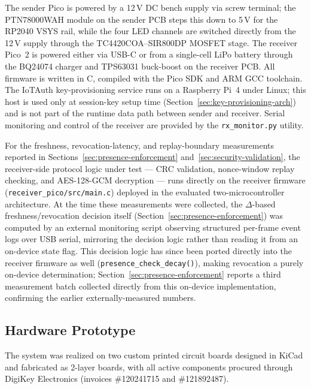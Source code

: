 \documentclass[conference]{IEEEtran}
\begin{document}
The sender Pico is powered by a 12\,V DC bench supply via screw terminal; the PTN78000WAH module on the sender PCB steps this down to 5\,V for the RP2040 VSYS rail, while the four LED channels are switched directly from the 12\,V supply through the TC4420COA--SIR800DP MOSFET stage. The receiver Pico~2 is powered either via USB-C or from a single-cell LiPo battery through the BQ24074 charger and TPS63031 buck-boost on the receiver PCB. All firmware is written in C, compiled with the Pico SDK and ARM GCC toolchain. The IoTAuth key-provisioning service runs on a Raspberry Pi~4 under Linux; this host is used only at session-key setup time (Section~\ref{sec:key-provisioning-arch}) and is not part of the runtime data path between sender and receiver. Serial monitoring and control of the receiver are provided by the \texttt{rx\_monitor.py} utility.

For the freshness, revocation-latency, and replay-boundary measurements reported in Sections~\ref{sec:presence-enforcement} and~\ref{sec:security-validation}, the receiver-side protocol logic under test — CRC validation, nonce-window replay checking, and AES-128-GCM decryption — runs directly on the receiver firmware (\texttt{receiver\_pico/src/main.c}) deployed in the evaluated two-microcontroller architecture. At the time these measurements were collected, the $\Delta$-based freshness/revocation decision itself (Section~\ref{sec:presence-enforcement}) was computed by an external monitoring script observing structured per-frame event logs over USB serial, mirroring the decision logic rather than reading it from an on-device state flag. This decision logic has since been ported directly into the receiver firmware as well (\texttt{presence\_check\_decay()}), making revocation a purely on-device determination; Section~\ref{sec:presence-enforcement} reports a third measurement batch collected directly from this on-device implementation, confirming the earlier externally-measured numbers.

\subsection{Hardware Prototype}

The system was realized on two custom printed circuit boards designed in KiCad and fabricated as 2-layer boards, with all active components procured through DigiKey Electronics (invoices \#120241715 and \#121892487).
\end{document}
